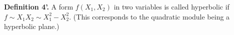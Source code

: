 \textbf{Definition 4'.} A form $f(X_1, X_2)$ in two variables is called hyperbolic if $f \sim X_1 X_2 \sim X_1^2 - X_2^2$. (This corresponds to the quadratic module being a hyperbolic plane.)
